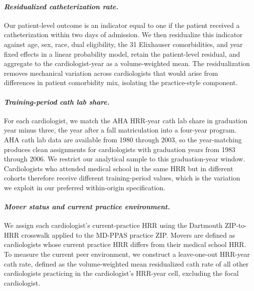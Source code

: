 \documentclass[12pt]{article}
\begin{document}
\paragraph{\textit{Residualized catheterization rate.}}
Our patient-level outcome is an indicator equal to one if the patient received a catheterization within two days of admission. We then residualize this indicator against age, sex, race, dual eligibility, the 31 Elixhauser comorbidities, and year fixed effects in a linear probability model, retain the patient-level residual, and aggregate to the cardiologist-year as a volume-weighted mean. The residualization removes mechanical variation across cardiologists that would arise from differences in patient comorbidity mix, isolating the practice-style component.

\paragraph{\textit{Training-period cath lab share.}}
For each cardiologist, we match the AHA HRR-year cath lab share in graduation year minus three, the year after a fall matriculation into a four-year program. AHA cath lab data are available from 1980 through 2003, so the year-matching produces clean assignments for cardiologists with graduation years from 1983 through 2006. We restrict our analytical sample to this graduation-year window. Cardiologists who attended medical school in the same HRR but in different cohorts therefore receive different training-period values, which is the variation we exploit in our preferred within-origin specification.

\paragraph{\textit{Mover status and current practice environment.}}
We assign each cardiologist's current-practice HRR using the Dartmouth ZIP-to-HRR crosswalk applied to the MD-PPAS practice ZIP. Movers are defined as cardiologists whose current practice HRR differs from their medical school HRR. To measure the current peer environment, we construct a leave-one-out HRR-year cath rate, defined as the volume-weighted mean residualized cath rate of all other cardiologists practicing in the cardiologist's HRR-year cell, excluding the focal cardiologist.
\end{document}
